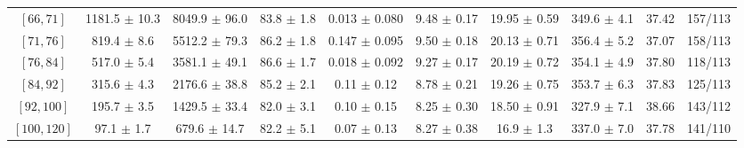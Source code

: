 \begin{tabular}{c||c|c|c|c|c|c|c||c|c}
$[66, 71]$ & 1181.5 $\pm$ 10.3 & 8049.9 $\pm$ 96.0 & 83.8 $\pm$ 1.8 & 0.013 $\pm$ 0.080 & 9.48 $\pm$ 0.17 & 19.95 $\pm$ 0.59 & 349.6 $\pm$ 4.1 & 37.42 & 157/113\\
$[71, 76]$ & 819.4 $\pm$ 8.6 & 5512.2 $\pm$ 79.3 & 86.2 $\pm$ 1.8 & 0.147 $\pm$ 0.095 & 9.50 $\pm$ 0.18 & 20.13 $\pm$ 0.71 & 356.4 $\pm$ 5.2 & 37.07 & 158/113\\
$[76, 84]$ & 517.0 $\pm$ 5.4 & 3581.1 $\pm$ 49.1 & 86.6 $\pm$ 1.7 & 0.018 $\pm$ 0.092 & 9.27 $\pm$ 0.17 & 20.19 $\pm$ 0.72 & 354.1 $\pm$ 4.9 & 37.80 & 118/113\\
$[84, 92]$ & 315.6 $\pm$ 4.3 & 2176.6 $\pm$ 38.8 & 85.2 $\pm$ 2.1 & 0.11 $\pm$ 0.12 & 8.78 $\pm$ 0.21 & 19.26 $\pm$ 0.75 & 353.7 $\pm$ 6.3 & 37.83 & 125/113\\
$[92, 100]$ & 195.7 $\pm$ 3.5 & 1429.5 $\pm$ 33.4 & 82.0 $\pm$ 3.1 & 0.10 $\pm$ 0.15 & 8.25 $\pm$ 0.30 & 18.50 $\pm$ 0.91 & 327.9 $\pm$ 7.1 & 38.66 & 143/112\\
$[100, 120]$ & 97.1 $\pm$ 1.7 & 679.6 $\pm$ 14.7 & 82.2 $\pm$ 5.1 & 0.07 $\pm$ 0.13 & 8.27 $\pm$ 0.38 & 16.9 $\pm$ 1.3 & 337.0 $\pm$ 7.0 & 37.78 & 141/110\\
\end{tabular}

